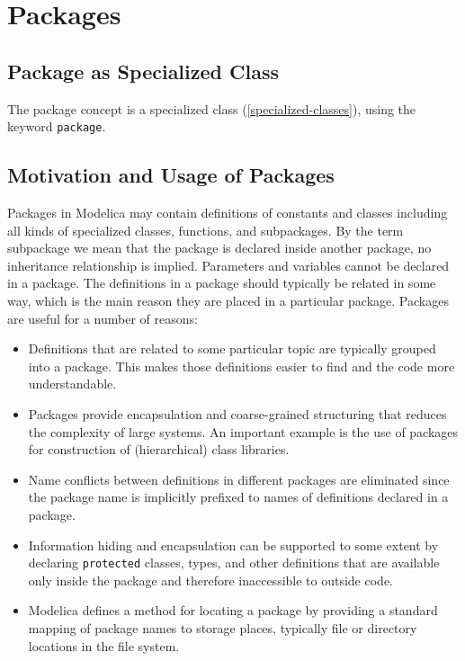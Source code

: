 \chapter{Packages}\label{packages}

\section{Package as Specialized Class}\label{package-as-specialized-class}

The package concept is a specialized class (\cref{specialized-classes}), using the
keyword \lstinline!package!.

\section{Motivation and Usage of Packages}\label{motivation-and-usage-of-packages}

\begin{nonnormative}
Packages in Modelica may contain definitions of constants and
classes including all kinds of specialized classes, functions, and
subpackages. By the term subpackage we mean that the package is declared
inside another package, no inheritance relationship is implied.
Parameters and variables cannot be declared in a package. The
definitions in a package should typically be related in some way, which
is the main reason they are placed in a particular package. Packages are
useful for a number of reasons:
\begin{itemize}
\item
  Definitions that are related to some particular topic are typically
  grouped into a package. This makes those definitions easier to find
  and the code more understandable.
\item
  Packages provide encapsulation and coarse-grained structuring
  that reduces the complexity of large systems. An important example is
  the use of packages for construction of (hierarchical) class
  libraries.
\item
  Name conflicts between definitions in different packages are
  eliminated since the package name is implicitly prefixed to names of
  definitions declared in a package.
\item
  Information hiding and encapsulation can be supported to some
  extent by declaring \lstinline!protected! classes, types, and other
  definitions that are available only inside the package and therefore
  inaccessible to outside code.
\item
  Modelica defines a method for locating a package by providing a
  standard mapping of package names to storage places, typically file or
  directory locations in the file system.
\end{itemize}
\end{nonnormative}

